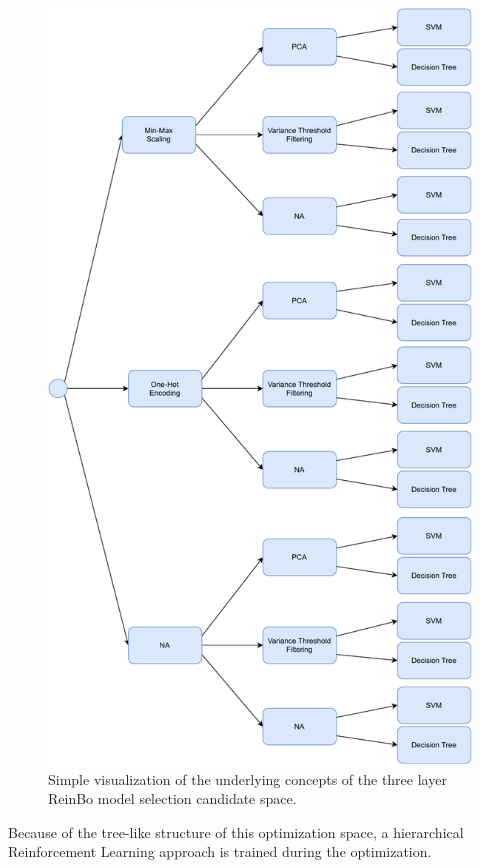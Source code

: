 \begin{figure}[ht!]
    \centering
    \includegraphics[height=\textheight,keepaspectratio]{gfx/Figures/Theory/ReinBoModelSelection.pdf}
    \caption{Simple visualization of the underlying concepts of the three layer ReinBo model selection candidate space.}
    \label{fig:theory:reinbo-model-selection}
\end{figure}
Because of the tree-like structure of this optimization space, a hierarchical Reinforcement Learning approach is trained during the optimization.
